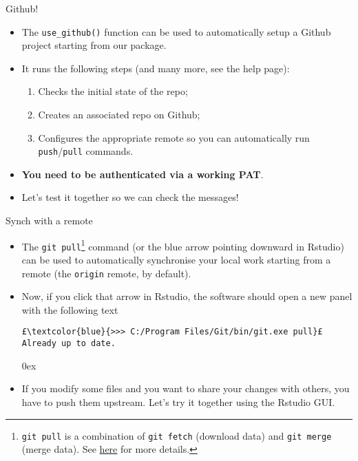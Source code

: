 \documentclass[
hyperref={bookmarks=false},
xcolor={dvipsnames,svgnames*,x11names*}, 
12pt
]{beamer}
\begin{document}
\begin{frame}[fragile]{Github!}
\vspace{-0.5cm}
\begin{itemize}
\itemsep 2ex
\item The \texttt{use\_github()} function can be used to automatically setup a Github project starting from our package. 
\item It runs the following steps (and many more, see the help page): 
\begin{enumerate}
\item Checks the initial state of the repo; 
\item Creates an associated repo on Github; 
\item Configures the appropriate remote so you can automatically run \texttt{push}/\texttt{pull} commands. 
\end{enumerate}
\item \textbf{You need to be authenticated via a working PAT}.
\item Let's test it together so we can check the messages! 
\end{itemize}
\end{frame}

\begin{frame}[fragile]{Synch with a remote}
\vspace{-0.5cm}
\begin{itemize}
\itemsep 1ex
\item The \texttt{git pull}\footnote{\texttt{git pull} is a combination of \texttt{git fetch} (download data) and \texttt{git merge} (merge data). See \href{https://git-scm.com/book/en/v2/Git-Basics-Working-with-Remotes}{here} for more details.} command (or the blue arrow pointing downward in Rstudio) can be used to automatically synchronise your local work starting from a remote (the \texttt{origin} remote, by default). 
\item Now, if you click that arrow in Rstudio, the software should open a new panel with the following text
\begin{lstlisting}
£\textcolor{blue}{>>> C:/Program Files/Git/bin/git.exe pull}£
Already up to date.
\end{lstlisting}
\itemsep 0ex
\item If you modify some files and you want to share your changes with others, you have to push them upstream. Let's try it together using the Rstudio GUI. 
\end{itemize}
\end{frame}
\end{document}
